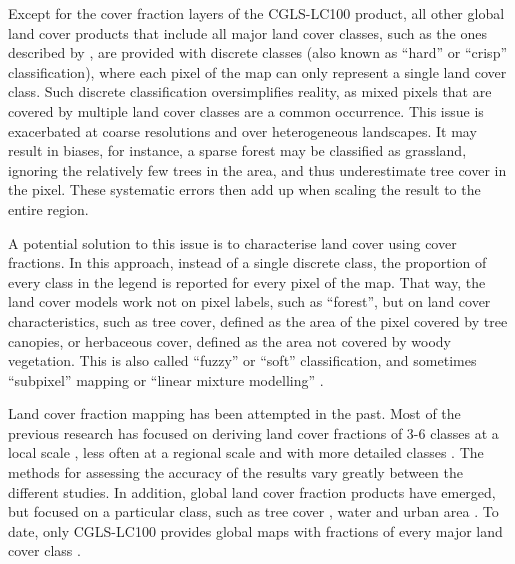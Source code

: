 \documentclass[review,authoryear,3p]{elsarticle}
\begin{document}
Except for the cover fraction layers of the \ac{CGLS-LC100} product, all other global land cover products that include all major land cover classes, such as the ones described by \citet{bartholome2005glc2000, friedl2010modis, arino2007globcover, see2015hybrid, chen2015globeland30}, are provided with discrete classes (also known as ``hard'' or ``crisp'' classification), where each pixel of the map can only represent a single land cover class.
Such discrete classification oversimplifies reality, as mixed pixels that are covered by multiple land cover classes are a common occurrence. 
This issue is exacerbated at coarse resolutions and over heterogeneous landscapes.
It may result in biases, for instance, a sparse forest may be classified as grassland, ignoring the relatively few trees in the area, and thus underestimate tree cover in the pixel.
These systematic errors then add up when scaling the result to the entire region.

A potential solution to this issue is to characterise land cover using cover fractions.
In this approach, instead of a single discrete class, the proportion of every class in the legend is reported for every pixel of the map.
That way, the land cover models work not on pixel labels, such as ``forest'', but on land cover characteristics, such as tree cover, defined as the area of the pixel covered by tree canopies, or herbaceous cover, defined as the area not covered by woody vegetation.
This is also called ``fuzzy'' or ``soft'' classification, and sometimes ``subpixel'' mapping or ``linear mixture modelling'' \citep{Okeke2006fuzzyexponent}.

Land cover fraction mapping has been attempted in the past.
Most of the previous research has focused on deriving land cover fractions of 3-6 classes at a local scale  \citep{adams_classification_1995, foody1996fuzzyevaluation, walton2008subpixelrf, hansen_continuous_2011, sharma_assessing_2011, uma_shankar_wavelet-fuzzy_2011, dwivedi_optimisation_2012, lizarazo_quantitative_2012, gessner_estimating_2013, okujeni_generalizing_2018}, less often at a regional scale and with more detailed classes \citep{colditz_land_2011}.
The methods for assessing the accuracy of the results vary greatly between the different studies.
In addition, global land cover fraction products have emerged, but focused on a particular class, such as tree cover \citep{hansen_global_2003, Hansen2013forestchange, townshend_global_2017}, water \citep{schroeder_development_2015, pekel_high-resolution_2016} and urban area \citep{corbane_automated_2019, gao_mapping_2020, gong_annual_2020}.
To date, only \ac{CGLS-LC100} \citep{marcel_buchhorn_copernicus_2019} provides global maps with fractions of every major land cover class \citep{nandin-erdene_tsendbazar_copernicus_2019}.
\end{document}
